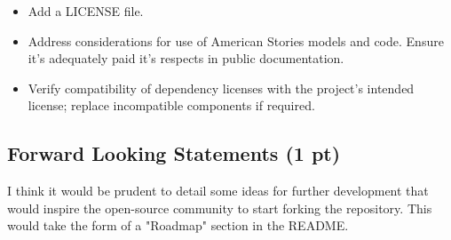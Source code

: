 \documentclass{article}
\begin{document}
\begin{itemize}[label=$\square$]
    \item Add a LICENSE file.
    
    \item Address considerations for use of American Stories models and code. Ensure it's adequately paid it's respects in public documentation.
    \item Verify compatibility of dependency licenses with the project's intended license; replace incompatible components if required.
\end{itemize}

\subsection {Forward Looking Statements (1 pt)}
I think it would be prudent to detail some ideas for further development that would inspire the open-source community to start forking the repository. This would take the form of a "Roadmap" section in the README.
\end{document}
